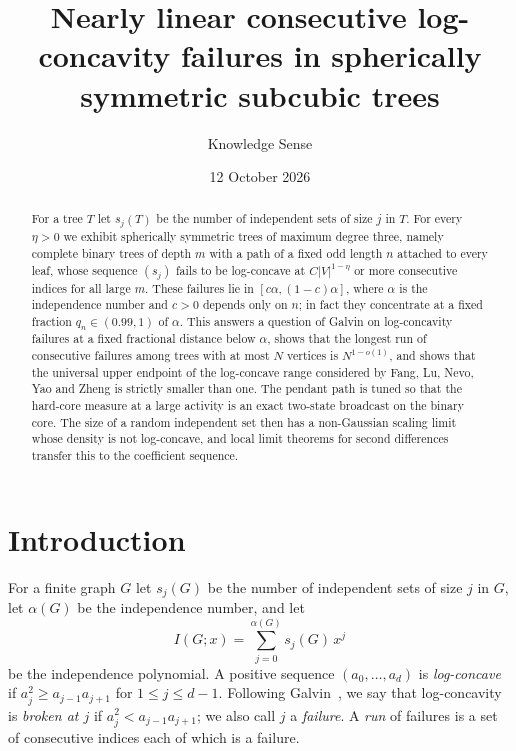 \documentclass{amsart}
\theoremstyle{definition}
\theoremstyle{remark}
\numberwithin{equation}{section}
\newcommand{\abs}[1]{\lvert #1\rvert}
\begin{document}
\title[Consecutive log-concavity failures in subcubic trees]{Nearly linear consecutive log-concavity failures in spherically symmetric subcubic trees}

\author{Knowledge Sense}
\address{Knowledge Sense}

\date{12 October 2026}



\begin{abstract}
For a tree $T$ let $s_j(T)$ be the number of independent sets of size $j$ in $T$. For every $\eta>0$ we exhibit spherically symmetric trees of maximum degree three, namely complete binary trees of depth $m$ with a path of a fixed odd length $n$ attached to every leaf, whose sequence $(s_j)$ fails to be log-concave at $C\abs{V}^{1-\eta}$ or more consecutive indices for all large $m$. These failures lie in $[c\alpha,(1-c)\alpha]$, where $\alpha$ is the independence number and $c>0$ depends only on $n$; in fact they concentrate at a fixed fraction $q_n\in(0.99,1)$ of $\alpha$. This answers a question of Galvin on log-concavity failures at a fixed fractional distance below $\alpha$, shows that the longest run of consecutive failures among trees with at most $N$ vertices is $N^{1-o(1)}$, and shows that the universal upper endpoint of the log-concave range considered by Fang, Lu, Nevo, Yao and Zheng is strictly smaller than one. The pendant path is tuned so that the hard-core measure at a large activity is an exact two-state broadcast on the binary core. The size of a random independent set then has a non-Gaussian scaling limit whose density is not log-concave, and local limit theorems for second differences transfer this to the coefficient sequence.
\end{abstract}

\maketitle

\section{Introduction}

For a finite graph $G$ let $s_j(G)$ be the number of independent sets of size $j$ in $G$, let $\alpha(G)$ be the independence number, and let
\[
I(G;x)=\sum_{j=0}^{\alpha(G)} s_j(G)\,x^j
\]
be the independence polynomial. A positive sequence $(a_0,\dots,a_d)$ is \emph{log-concave} if $a_j^2\ge a_{j-1}a_{j+1}$ for $1\le j\le d-1$. Following Galvin~\cite{Gal26}, we say that log-concavity is \emph{broken at $j$} if $a_j^2<a_{j-1}a_{j+1}$; we also call $j$ a \emph{failure}. A \emph{run} of failures is a set of consecutive indices each of which is a failure.
\end{document}
